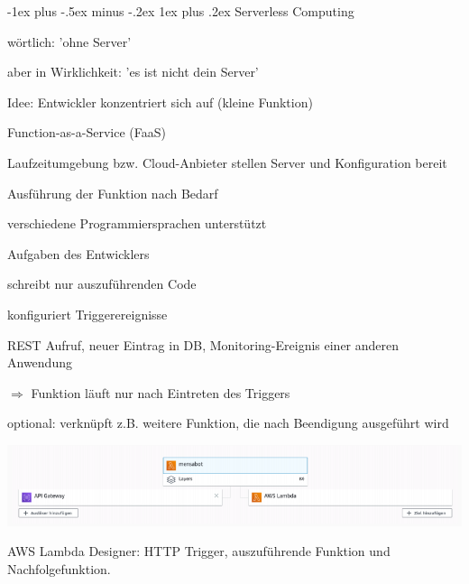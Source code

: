 \documentclass[10pt]{article}
\makeatletter
\renewcommand{\subsubsection}{\@startsection{subsubsection}{3}{0mm}%
                                {-1ex plus -.5ex minus -.2ex}%
                                {1ex plus .2ex}%
                                {\normalfont\small\bfseries}}
\makeatother
\begin{document}
\subsubsection{Serverless Computing}
\begin{itemize*}
  \item wörtlich: 'ohne Server'
  \begin{itemize*}
    \item aber in Wirklichkeit: 'es ist nicht dein Server'
    \item Idee: Entwickler konzentriert sich auf (kleine Funktion)
    \begin{itemize*}
      \item Function-as-a-Service (FaaS)
    \end{itemize*}
    \item Laufzeitumgebung bzw. Cloud-Anbieter stellen Server und Konfiguration bereit
    \item Ausführung der Funktion nach Bedarf
    \item verschiedene Programmiersprachen unterstützt
  \end{itemize*}
\end{itemize*}
Aufgaben des Entwicklers
\begin{itemize*}
  \item schreibt nur auszuführenden Code
  \item konfiguriert Triggerereignisse
  \begin{itemize*}
    \item REST Aufruf, neuer Eintrag in DB, Monitoring-Ereignis einer anderen Anwendung
    \item $\Rightarrow$ Funktion läuft nur nach Eintreten des Triggers
    \item optional: verknüpft z.B. weitere Funktion, die nach Beendigung ausgeführt wird
  \end{itemize*}
\end{itemize*}
\begin{center}
  \includegraphics[width=0.4\linewidth]{Assets/Programmierparadigmen-aws-lambda-designer}
\end{center}
AWS Lambda Designer: HTTP Trigger, auszuführende Funktion und Nachfolgefunktion.
\end{document}
